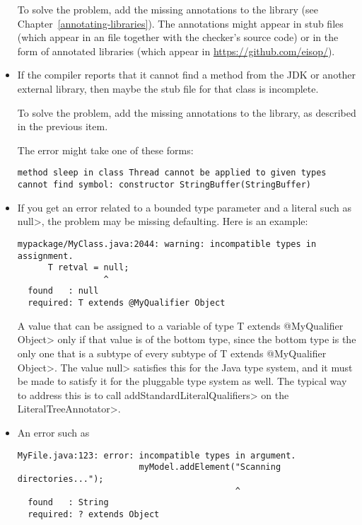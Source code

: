 \begin{itemize}
To solve the problem, add the missing annotations to the library (see
Chapter~\ref{annotating-libraries}).  The
annotations might appear in stub files (which appear
in an  file together with the checker's source code)
or in the form of annotated libraries (which appear
in \url{https://github.com/eisop/}).

\item
If the compiler reports that it cannot find a method from the JDK or
another external library, then maybe the stub file for that class
is incomplete.

To solve the problem, add the missing annotations to the library, as
described in the previous item.

The error might take one of these forms:

\begin{Verbatim}
method sleep in class Thread cannot be applied to given types
cannot find symbol: constructor StringBuffer(StringBuffer)
\end{Verbatim}

\item
If you get an error related to a bounded type parameter and a literal such
as \<null>, the problem may be missing defaulting.  Here is an example:

\begin{Verbatim}
mypackage/MyClass.java:2044: warning: incompatible types in assignment.
      T retval = null;
                 ^
  found   : null
  required: T extends @MyQualifier Object
\end{Verbatim}

\noindent
A value that can be assigned to a variable of type \<T extends @MyQualifier
Object> only if that value is of the bottom type, since the bottom type is
the only one that is a subtype of every subtype of \<T extends @MyQualifier
Object>.  The value \<null> satisfies this for the Java type system, and it
must be made to satisfy it for the pluggable type system as well.  The
typical way to address this is to call \<addStandardLiteralQualifiers> on the \<LiteralTreeAnnotator>.

\item
An error such as

\begin{Verbatim}
MyFile.java:123: error: incompatible types in argument.
                        myModel.addElement("Scanning directories...");
                                           ^
  found   : String
  required: ? extends Object
\end{Verbatim}


\end{itemize}
